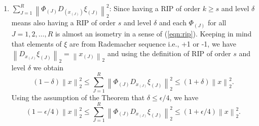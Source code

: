 \documentclass[twoside,11pt]{article}
\newcommand\norm[1]{\left\lVert#1\right\rVert}
\begin{document}
\begin{enumerate}
    \item $ \sum_{J=1}^R \norm{\Phi_{(J)} D_{(x_{(J)})} \xi_{(J)}}_2^2$: Since having a RIP of order $k \geq s$ and level $\delta$ means also having a RIP of order $s$ and level $\delta$ and each $\Phi_{(J)}$ for all $J = 1, 2, \dots, R$ is almost an isometry in a sense of (\ref{eqn:rip}). Keeping in mind that elements of $\xi$ are from Rademacher sequence i.e., +1 or -1, we have $ \norm{D_{x_{(J)}} \xi_{(J)}}_2 = \norm{x_{(J)}}_2$ and using the definition of RIP of order $s$ and level $\delta$ we obtain
    $$
    (1 - \delta) \norm{x}_2^2 \leq \sum_{J=1}^R \norm{\Phi_{(J)} D_{x_{(J)}} \xi_{(J)}}_2^2 \leq (1 + \delta) \norm{x}_2^2.
    $$
    Using the assumption of the Theorem that $\delta \leq \epsilon/4$, we have
    \begin{equation}
    \label{eqn:iso_jl5}
    (1 - \epsilon/4) \norm{x}_2^2 \leq \sum_{J=1}^R \norm{\Phi_{(J)} D_{x_{(J)}} \xi_{(J)}}_2^2 \leq (1 + \epsilon/4) \norm{x}_2^2.
    \end{equation}
    

\end{enumerate}
\end{document}
